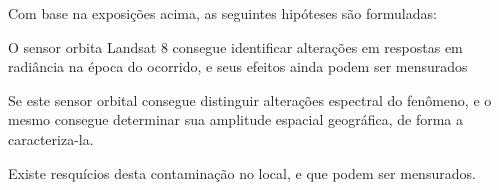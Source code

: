 %
\hspace*{1.25 cm} Com base na exposições acima, as seguintes hipóteses são formuladas:
\begin{description} [itemsep=1pt,parsep=1pt]\vspace{0.00mm} 
	\item[$H_{1}$:\label{h1}] O sensor orbita Landsat 8 consegue identificar alterações em respostas em radiância na época  do ocorrido, e seus efeitos ainda podem ser mensurados
	\item[$H_{2}$:\label{h2}] Se este sensor orbital consegue distinguir alterações espectral  do fenômeno, e o mesmo consegue determinar sua amplitude espacial geográfica, de forma a caracteriza-la.
	\item[$H_{3}$:\label{h3}] Existe resquícios desta contaminação no local, e que podem ser mensurados.
\end{description}
